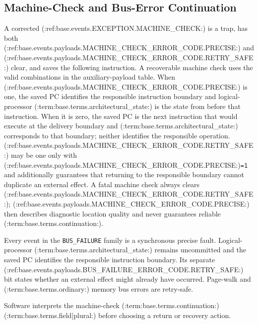 \subsection{Machine-Check and Bus-Error Continuation}
A corrected (:ref:base.events.EXCEPTION.MACHINE_CHECK:) is a trap, has both (:ref:base.events.payloads.MACHINE_CHECK_ERROR_CODE.PRECISE:) and (:ref:base.events.payloads.MACHINE_CHECK_ERROR_CODE.RETRY_SAFE:) clear, and saves
the following instruction. A recoverable machine check uses the valid combinations in the auxiliary-payload table.
When (:ref:base.events.payloads.MACHINE_CHECK_ERROR_CODE.PRECISE:) is one, the saved PC identifies the responsible instruction boundary and logical-processor
(:term:base.terms.architectural_state:) is the state from before that instruction. When it is zero, the saved PC is the next instruction that would
execute at the delivery boundary and (:term:base.terms.architectural_state:) corresponds to that boundary; neither identifies the responsible
operation. (:ref:base.events.payloads.MACHINE_CHECK_ERROR_CODE.RETRY_SAFE:) may be one only with (:ref:base.events.payloads.MACHINE_CHECK_ERROR_CODE.PRECISE:)\texttt{=1} and additionally guarantees that returning
to the responsible boundary cannot duplicate an external effect. A fatal machine check always clears
(:ref:base.events.payloads.MACHINE_CHECK_ERROR_CODE.RETRY_SAFE:); (:ref:base.events.payloads.MACHINE_CHECK_ERROR_CODE.PRECISE:) then describes diagnostic location quality and never guarantees reliable
(:term:base.terms.continuation:).

Every event in the \texttt{BUS\_FAILURE} family is a synchronous precise fault. Logical-processor (:term:base.terms.architectural_state:) remains uncommitted and the saved PC
identifies the responsible instruction boundary. Its separate (:ref:base.events.payloads.BUS_FAILURE_ERROR_CODE.RETRY_SAFE:) bit states whether an external
effect might already have occurred. Page-walk and (:term:base.terms.ordinary:) memory bus errors are retry-safe.

Software interprets the machine-check (:term:base.terms.continuation:) (:term:base.terms.field|plural:) before choosing a return or recovery action.
